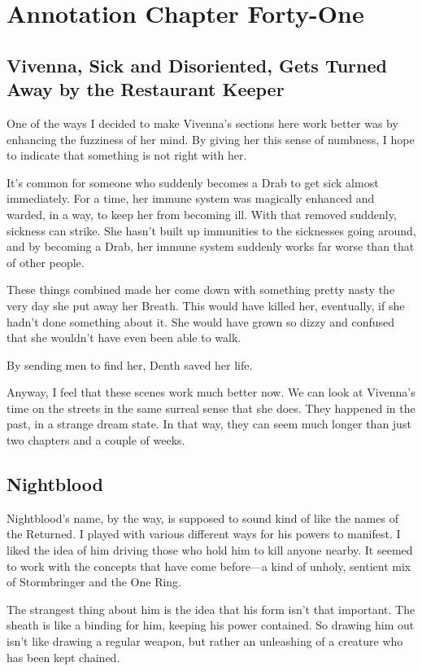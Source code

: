 \section{Annotation Chapter Forty-One}

\subsection*{Vivenna, Sick and Disoriented, Gets Turned Away by the Restaurant Keeper}

One of the ways I decided to make Vivenna’s sections here work better was by enhancing the fuzziness of her mind. By giving her this sense of numbness, I hope to indicate that something is not right with her.

It’s common for someone who suddenly becomes a Drab to get sick almost immediately. For a time, her immune system was magically enhanced and warded, in a way, to keep her from becoming ill. With that removed suddenly, sickness can strike. She hasn’t built up immunities to the sicknesses going around, and by becoming a Drab, her immune system suddenly works far worse than that of other people.

These things combined made her come down with something pretty nasty the very day she put away her Breath. This would have killed her, eventually, if she hadn’t done something about it. She would have grown so dizzy and confused that she wouldn’t have even been able to walk.

By sending men to find her, Denth saved her life.

Anyway, I feel that these scenes work much better now. We can look at Vivenna’s time on the streets in the same surreal sense that she does. They happened in the past, in a strange dream state. In that way, they can seem much longer than just two chapters and a couple of weeks.

\subsection*{Nightblood}

Nightblood’s name, by the way, is supposed to sound kind of like the names of the Returned. I played with various different ways for his powers to manifest. I liked the idea of him driving those who hold him to kill anyone nearby. It seemed to work with the concepts that have come before—a kind of unholy, sentient mix of Stormbringer and the One Ring.

The strangest thing about him is the idea that his form isn’t that important. The sheath is like a binding for him, keeping his power contained. So drawing him out isn’t like drawing a regular weapon, but rather an unleashing of a creature who has been kept chained.

